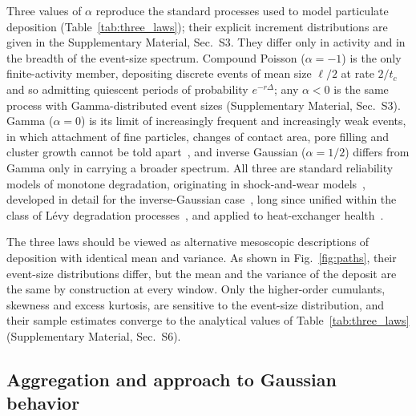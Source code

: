 \documentclass[preprint,12pt]{elsarticle}
\begin{document}
Three values of $\alpha$ reproduce the standard processes used to model
particulate deposition (Table~\ref{tab:three_laws}); their explicit increment
distributions are given in the Supplementary Material, Sec.~S3.
They differ only in
activity and in the breadth of the event-size spectrum. Compound Poisson
($\alpha=-1$) is the only finite-activity member, depositing discrete events of
mean size $\ell/2$ at rate $2/t_c$ and so admitting quiescent periods of
probability $e^{-r\Delta}$; any $\alpha<0$ is the same process with
Gamma-distributed event sizes (Supplementary Material, Sec.~S3). 
Gamma ($\alpha=0$) is its limit of increasingly
frequent and increasingly weak events, in which attachment of fine particles,
changes of contact area, pore filling and cluster growth cannot be told
apart~\cite{AbdelHameed1975,LawlessCrowder2004,vanNoortwijk2009}, and inverse
Gaussian ($\alpha=1/2$) differs from Gamma only in carrying a broader spectrum.
All three are standard reliability models of monotone degradation, originating
in shock-and-wear models~\cite{Esary1973}, developed in detail for the
inverse-Gaussian case~\cite{WangXu2010,YeChen2014,YeXie2015,Si2011,Kahle2016},
long since unified within the class of L\'evy degradation
processes~\cite{Cinlar1977,AbdelHameed1984,Shu2016}, and applied to heat-exchanger health~\cite{Collet2026}.

The three laws should be viewed as alternative mesoscopic descriptions of
deposition with identical mean and variance. As shown in
Fig.~\ref{fig:paths}, their event-size distributions differ, but the mean
and the variance of the deposit are the same by construction at every
window. Only the higher-order cumulants, skewness and excess kurtosis, are
sensitive to the event-size distribution, and their sample estimates
converge to the analytical values of Table~\ref{tab:three_laws}
(Supplementary Material, Sec.~S6).

\subsection{Aggregation and approach to Gaussian behavior}
\label{sec:aggregation}
\end{document}
